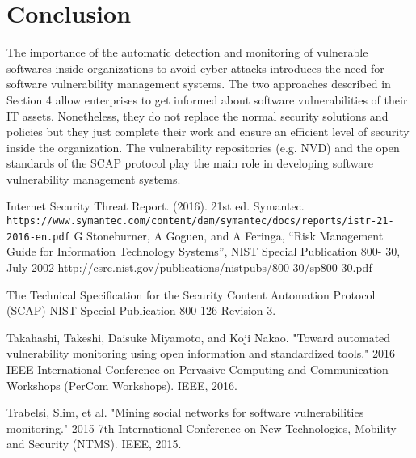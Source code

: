 \documentclass{llncs}
\begin{document}
 \newpage  
\section{Conclusion}

\par The importance of the automatic detection and monitoring of vulnerable softwares inside organizations to avoid cyber-attacks introduces the need for software vulnerability management systems. The two approaches described in Section 4 allow enterprises to get informed about software vulnerabilities of their IT assets. Nonetheless, they do not replace the normal security solutions and policies but they just complete their work and ensure an efficient level of security inside the organization. The vulnerability repositories (e.g. NVD) and the open standards of the SCAP protocol play the main role in developing software vulnerability management systems.   


\newpage
\begin{thebibliography}{[MT1]}

%


Internet Security Threat Report. (2016). 21st ed. Symantec.
\\\texttt{https://www.symantec.com/content/dam/symantec/docs/reports/istr-21-2016-en.pdf}
G Stoneburner, A Goguen, and A Feringa, “Risk Management Guide
for Information Technology Systems”, NIST Special Publication 800-
30, July 2002
http://csrc.nist.gov/publications/nistpubs/800-30/sp800-30.pdf

The Technical Specification for the
Security Content Automation Protocol (SCAP)
NIST Special Publication 800-126
Revision 3.

Takahashi, Takeshi, Daisuke Miyamoto, and Koji Nakao. "Toward automated vulnerability monitoring using open information and standardized tools." 2016 IEEE International Conference on Pervasive Computing and Communication Workshops (PerCom Workshops). IEEE, 2016.

Trabelsi, Slim, et al. "Mining social networks for software vulnerabilities monitoring." 2015 7th International Conference on New Technologies, Mobility and Security (NTMS). IEEE, 2015.
%
\end{thebibliography}
\end{document}
